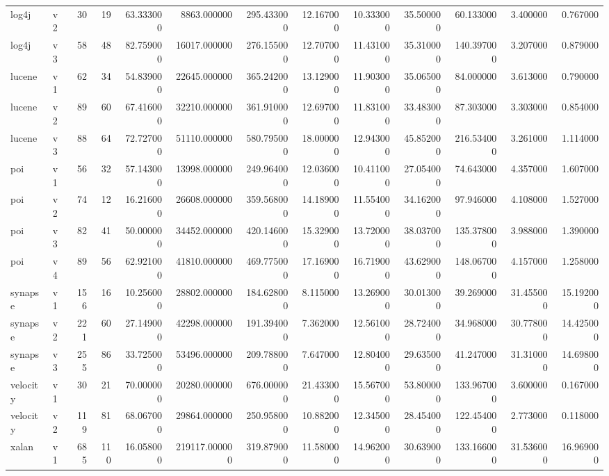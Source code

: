 \begin{table}
\begin{tabular}{llrrrrrrrrrrr}
log4j & v2 & 30 & 19 & 63.333000 & 8863.000000 & 295.433000 & 12.167000 & 10.333000 & 35.500000 & 60.133000 & 3.400000 & 0.767000 \\
log4j & v3 & 58 & 48 & 82.759000 & 16017.000000 & 276.155000 & 12.707000 & 11.431000 & 35.310000 & 140.397000 & 3.207000 & 0.879000 \\
lucene & v1 & 62 & 34 & 54.839000 & 22645.000000 & 365.242000 & 13.129000 & 11.903000 & 35.065000 & 84.000000 & 3.613000 & 0.790000 \\
lucene & v2 & 89 & 60 & 67.416000 & 32210.000000 & 361.910000 & 12.697000 & 11.831000 & 33.483000 & 87.303000 & 3.303000 & 0.854000 \\
lucene & v3 & 88 & 64 & 72.727000 & 51110.000000 & 580.795000 & 18.000000 & 12.943000 & 45.852000 & 216.534000 & 3.261000 & 1.114000 \\
poi & v1 & 56 & 32 & 57.143000 & 13998.000000 & 249.964000 & 12.036000 & 10.411000 & 27.054000 & 74.643000 & 4.357000 & 1.607000 \\
poi & v2 & 74 & 12 & 16.216000 & 26608.000000 & 359.568000 & 14.189000 & 11.554000 & 34.162000 & 97.946000 & 4.108000 & 1.527000 \\
poi & v3 & 82 & 41 & 50.000000 & 34452.000000 & 420.146000 & 15.329000 & 13.720000 & 38.037000 & 135.378000 & 3.988000 & 1.390000 \\
poi & v4 & 89 & 56 & 62.921000 & 41810.000000 & 469.775000 & 17.169000 & 16.719000 & 43.629000 & 148.067000 & 4.157000 & 1.258000 \\
synapse & v1 & 156 & 16 & 10.256000 & 28802.000000 & 184.628000 & 8.115000 & 13.269000 & 30.013000 & 39.269000 & 31.455000 & 15.192000 \\
synapse & v2 & 221 & 60 & 27.149000 & 42298.000000 & 191.394000 & 7.362000 & 12.561000 & 28.724000 & 34.968000 & 30.778000 & 14.425000 \\
synapse & v3 & 255 & 86 & 33.725000 & 53496.000000 & 209.788000 & 7.647000 & 12.804000 & 29.635000 & 41.247000 & 31.310000 & 14.698000 \\
velocity & v1 & 30 & 21 & 70.000000 & 20280.000000 & 676.000000 & 21.433000 & 15.567000 & 53.800000 & 133.967000 & 3.600000 & 0.167000 \\
velocity & v2 & 119 & 81 & 68.067000 & 29864.000000 & 250.958000 & 10.882000 & 12.345000 & 28.454000 & 122.454000 & 2.773000 & 0.118000 \\
xalan & v1 & 685 & 110 & 16.058000 & 219117.000000 & 319.879000 & 11.580000 & 14.962000 & 30.639000 & 133.166000 & 31.536000 & 16.969000 \\

\end{tabular}
\end{table}
